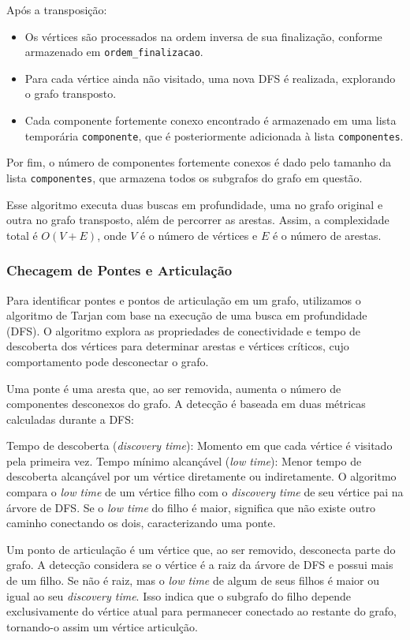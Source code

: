 \documentclass[12pt]{article}
\begin{document}
Após a transposição:
\begin{itemize}
  \item Os vértices são processados na ordem inversa de sua finalização, conforme armazenado em \texttt{ordem\_finalizacao}.
  \item Para cada vértice ainda não visitado, uma nova DFS é realizada, explorando o grafo transposto.
  \item Cada componente fortemente conexo encontrado é armazenado em uma lista temporária \texttt{componente}, que é posteriormente adicionada à lista \texttt{componentes}.
\end{itemize}

Por fim, o número de componentes fortemente conexos é dado pelo tamanho da lista \texttt{componentes}, que armazena todos os subgrafos do grafo em questão.

Esse algoritmo executa duas buscas em profundidade, uma no grafo original e outra no grafo transposto, além de percorrer as arestas. Assim, a complexidade total é \(O(V + E)\), onde \(V\) é o número de vértices e \(E\) é o número de arestas.


\subsubsection{Checagem de Pontes e Articulação}
Para identificar pontes e pontos de articulação em um grafo, utilizamos o algoritmo de Tarjan com base na execução de uma busca em profundidade (DFS). O algoritmo explora as propriedades de conectividade e tempo de descoberta dos vértices para determinar arestas e vértices críticos, cujo comportamento pode desconectar o grafo.

Uma ponte é uma aresta que, ao ser removida, aumenta o número de componentes desconexos do grafo. A detecção é baseada em duas métricas calculadas durante a DFS:

Tempo de descoberta (\textit{discovery time}): Momento em que cada vértice é visitado pela primeira vez.
Tempo mínimo alcançável (\textit{low time}): Menor tempo de descoberta alcançável por um vértice diretamente ou indiretamente.
O algoritmo compara o \textit{low time} de um vértice filho com o \textit{discovery time} de seu vértice pai na árvore de DFS. Se o \textit{low time} do filho é maior, significa que não existe outro caminho conectando os dois, caracterizando uma ponte.

Um ponto de articulação é um vértice que, ao ser removido, desconecta parte do grafo. A detecção considera se o vértice é a raiz da árvore de DFS e possui mais de um filho.
Se não é raiz, mas o \textit{low time} de algum de seus filhos é maior ou igual ao seu \textit{discovery time}. Isso indica que o subgrafo do filho depende exclusivamente do vértice atual para permanecer conectado ao restante do grafo, tornando-o assim um vértice articulção.
\end{document}
